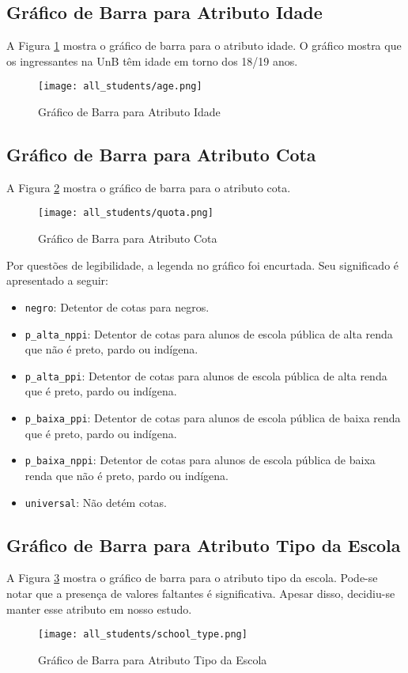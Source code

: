 \subsection{Gráfico de Barra para Atributo Idade}
A Figura \ref{atr_age} mostra o gráfico de barra para o atributo idade. O gráfico
mostra que os ingressantes na UnB têm idade em torno dos 18/19 anos. 
\begin{figure}[!ht]
    \caption{Gráfico de Barra para Atributo Idade}
    \centering
    \texttt{[image: all\_students/age.png]}
    \label{atr_age}
\end{figure}

\subsection{Gráfico de Barra para Atributo Cota}
A Figura \ref{atr_quota} mostra o gráfico de barra para o atributo cota. 
\begin{figure}[!ht]
    \caption{Gráfico de Barra para Atributo Cota}
    \centering
    \texttt{[image: all\_students/quota.png]}
    \label{atr_quota}
\end{figure}

Por questões de legibilidade, a legenda no gráfico foi encurtada. Seu significado é
apresentado a seguir: 
\begin{itemize}
    \item \texttt{negro}: Detentor de cotas para negros.
    \item \texttt{p\_alta\_nppi}: Detentor de cotas para alunos de escola pública de
        alta renda que não é preto, pardo ou indígena.
    \item \texttt{p\_alta\_ppi}: Detentor de cotas para alunos de escola pública de
        alta renda que é preto, pardo ou indígena.
    \item \texttt{p\_baixa\_ppi}: Detentor de cotas para alunos de escola pública de
        baixa renda que é preto, pardo ou indígena.
    \item \texttt{p\_baixa\_nppi}: Detentor de cotas para alunos de escola pública de
        baixa renda que não é preto, pardo ou indígena.
    \item \texttt{universal}: Não detém cotas.
\end{itemize}

\subsection{Gráfico de Barra para Atributo Tipo da Escola}
A Figura \ref{atr_school} mostra o gráfico de barra para o atributo tipo da escola.
Pode-se notar que a presença de valores faltantes é significativa. Apesar disso,
decidiu-se manter esse atributo em nosso estudo. 
\begin{figure}[!ht]
    \caption{Gráfico de Barra para Atributo Tipo da Escola}
    \centering
    \texttt{[image: all\_students/school\_type.png]}
    \label{atr_school}
\end{figure}


